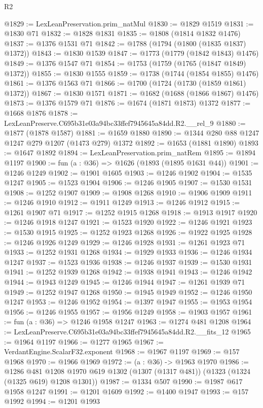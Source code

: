 \begin{lexlean}{R2}
\begin{coremodule}
@1829 := LexLeanPreservation.prim_natMul
@1830 := @1829 @1519
@1831 := @1830 @71
@1832 := @1828 @1831
@1835 := @1808 (@1814 @1832 @1476)
@1837 := @1376 @1531 @71
@1842 := @1788 (@1794 (@1800 (@1835 @1837) @1372))
@1843 := @1830 @1539
@1847 := @1773 (@1779 (@1842 @1843) @1476)
@1849 := @1376 @1547 @71
@1854 := @1753 (@1759 (@1765 (@1847 @1849) @1372))
@1855 := @1830 @1555
@1859 := @1738 (@1744 (@1854 @1855) @1476)
@1861 := @1376 @1563 @71
@1866 := @1700 (@1724 (@1730 (@1859 @1861) @1372))
@1867 := @1830 @1571
@1871 := @1682 (@1688 (@1866 @1867) @1476)
@1873 := @1376 @1579 @71
@1876 := @1674 (@1871 @1873) @1372
@1877 := @1668 @1876
@1878 := LexLeanPreserve.C695b31e03a94bc33ffef7945645a84dd.R2.__rel_9
@1880 := @1877 (@1878 @1587)
@1881 := @1659 @1880
@1890 := @1344 @280 @88 @1247 @1247 @279 @1207 (@1473 @279) @1372
@1892 := @1653 (@1881 @1890)
@1893 := @1647 @1892
@1894 := LexLeanPreservation.prim_natRem
@1895 := @1894 @1197
@1900 := fun (a : @36) => @1626 (@1893 (@1895 @1631 @44))
@1901 := @1246 @1249
@1902 := @1901 @1605
@1903 := @1246 @1902
@1904 := @1535 @1247
@1905 := @1523 @1904
@1906 := @1246 @1905
@1907 := @1530 @1531
@1908 := @1252 @1907
@1909 := @1908 @1268
@1910 := @1906 @1909
@1911 := @1246 @1910
@1912 := @1911 @1249
@1913 := @1246 @1912
@1915 := @1261 @1907 @71
@1917 := @1252 @1915 @1268
@1918 := @1913 @1917
@1920 := @1246 @1918 @1247
@1921 := @1523 @1920
@1922 := @1246 @1921
@1923 := @1530 @1915
@1925 := @1252 @1923 @1268
@1926 := @1922 @1925
@1928 := @1246 @1926 @1249
@1929 := @1246 @1928
@1931 := @1261 @1923 @71
@1933 := @1252 @1931 @1268
@1934 := @1929 @1933
@1936 := @1246 @1934 @1247
@1937 := @1523 @1936
@1938 := @1246 @1937
@1939 := @1530 @1931
@1941 := @1252 @1939 @1268
@1942 := @1938 @1941
@1943 := @1246 @1942
@1944 := @1943 @1249
@1945 := @1246 @1944
@1947 := @1261 @1939 @71
@1949 := @1252 @1947 @1268
@1950 := @1945 @1949
@1952 := @1246 @1950 @1247
@1953 := @1246 @1952
@1954 := @1397 @1947
@1955 := @1953 @1954
@1956 := @1246 @1955
@1957 := @1956 @1249
@1958 := @1903 @1957
@1961 := fun (a : @36) => @1246 @1958 @1247
@1963 := @1274 @481 @1208
@1964 := LexLeanPreserve.C695b31e03a94bc33ffef7945645a84dd.R2.__fits_12
@1965 := @1964 @1197
@1966 := @1277 @1965
@1967 := VerdantEngine.ScalarF32.exponent
@1968 := @1967 @1197
@1969 := @157 @1968
@1970 := @1966 @1969
@1972 := (a : @36) -> @1963 @1970
@1986 := @1286
    @481
    @1208
    @1970
    @619
    @1302
    (@1307 (@1317 @481))
    (@1323 (@1324 (@1325 @619) @1208 @1301))
@1987 := @1334 @507
@1990 := @1987 @617 @1958 @1247
@1991 := @1201 @1609
@1992 := @1400 @1947
@1993 := @157 @1992
@1994 := @1201 @1993

\end{coremodule}
\end{lexlean}
